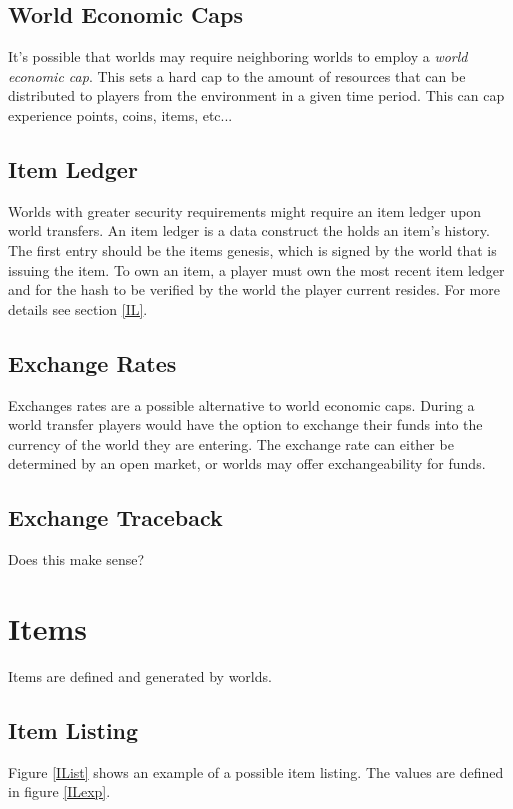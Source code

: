 \documentclass[runningheads,a4paper]{llncs}
\begin{document}
\subsection{World Economic Caps}
It's possible that worlds may require neighboring worlds to employ a \textit{world economic cap}. This sets a hard cap to the amount of resources that can be distributed to players from the environment in a given time period. This can cap experience points, coins, items, etc...

\subsection{Item Ledger}
\label{shIL}
Worlds with greater security requirements might require an item ledger upon world transfers. An item ledger is a data construct the holds an item's history. The first entry should be the items genesis, which is signed by the world that is issuing the item. To own an item, a player must own the most recent item ledger and for the hash to be verified by the world the player current resides. For more details see section \ref{IL}.

\subsection{Exchange Rates}
\label{ER}
Exchanges rates are a possible alternative to world economic caps. During a world transfer players would have the option to exchange their funds into the currency of the world they are entering. The exchange rate can either be determined by an open market, or worlds may offer exchangeability for funds.


\subsection{Exchange Traceback}
Does this make sense?

\section{Items} 
Items are defined and generated by worlds.  

\subsection{Item Listing}
Figure \ref{IList} shows an example of a possible item listing. The values are defined in figure \ref{ILexp}. 
\end{document}
